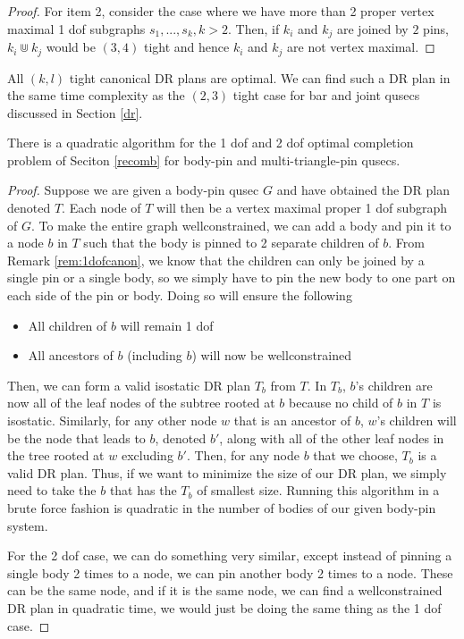 \begin{proof}

    For item 2, consider the case where we have more than 2 proper vertex maximal 1 dof subgraphs $s_1, ..., s_k, k > 2$. Then, if $k_i$ and $k_j$ are joined by $2$ pins, $k_i \Cup k_j$ would be $(3,4)$ tight and hence $k_i$ and $k_j$ are not vertex maximal.
\end{proof}

\begin{remark}
    All $(k,l)$ tight canonical DR plans are optimal. We can find such a DR plan in the same time complexity as the $(2,3)$ tight case for bar and joint qusecs discussed in Section \ref{dr}.
\end{remark}

\begin{theorem}
    There is a quadratic algorithm for the 1 dof and 2 dof optimal completion problem of Seciton \ref{recomb} for body-pin and multi-triangle-pin qusecs.
\end{theorem}

\begin{proof}
    Suppose we are given a body-pin qusec $G$ and have obtained the DR plan denoted $T$. Each node of $T$ will then be a vertex maximal proper 1 dof subgraph of $G$. To make the entire graph wellconstrained, we can add a body and pin it to a node $b$ in $T$ such that the body is pinned to 2 separate children of $b$. From Remark \ref{rem:1dofcanon}, we know that the children can only be joined by a single pin or a single body, so we simply have to pin the new body to one part on each side of the pin or body. Doing so will ensure the following

    \begin{itemize}
        \item All children of $b$ will remain 1 dof
        \item All ancestors of $b$ (including $b$) will now be wellconstrained
    \end{itemize}

    Then, we can form a valid isostatic DR plan $T_b$ from $T$. In $T_b$, $b$'s children are now all of the leaf nodes of the subtree rooted at $b$ because no child of $b$ in $T$ is isostatic. Similarly, for any other node $w$ that is an ancestor of $b$, $w$'s children will be the node that leads to $b$, denoted $b'$, along with all of the other leaf nodes in the tree rooted at $w$ excluding $b'$. Then, for any node $b$ that we choose, $T_b$ is a valid DR plan. Thus, if we want to minimize the size of our DR plan, we simply need to take the $b$ that has the $T_b$ of smallest size. Running this algorithm in a brute force fashion is quadratic in the number of bodies of our given body-pin system.

    For the 2 dof case, we can do something very similar, except instead of pinning a single body 2 times to a node, we can pin another body 2 times to a node. These can be the same node, and if it is the same node, we can find a wellconstrained DR plan in quadratic time, we would just be doing the same thing as the 1 dof case.
\end{proof}
